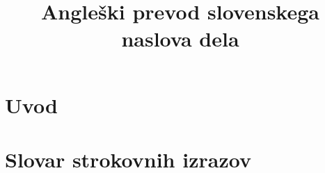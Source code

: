 \documentclass[mat1]{../fmfdelo}
\title{Angleški prevod slovenskega naslova dela}
\begin{document}
\section{Uvod}


\section*{Slovar strokovnih izrazov}

\geslo{}{}
\geslo{}{}

\begin{thebibliography}{99}


\end{thebibliography}
\end{document}
